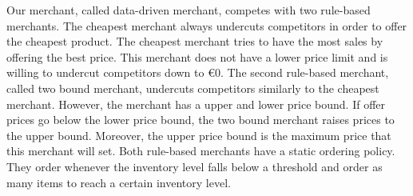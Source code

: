 Our merchant, called data-driven merchant, competes with two rule-based merchants.
The cheapest merchant always undercuts competitors in order to offer the cheapest product.
The cheapest merchant tries to have the most sales by offering the best price.
This merchant does not have a lower price limit and is willing to undercut competitors down to €0.
The second rule-based merchant, called two bound merchant, undercuts competitors similarly to the cheapest merchant.
However, the merchant has a upper and lower price bound.
If offer prices go below the lower price bound, the two bound merchant raises prices to the upper bound.
Moreover, the upper price bound is the maximum price that this merchant will set.
Both rule-based merchants have a static ordering policy.
They order whenever the inventory level falls below a threshold and order as many items to reach a certain inventory level.

